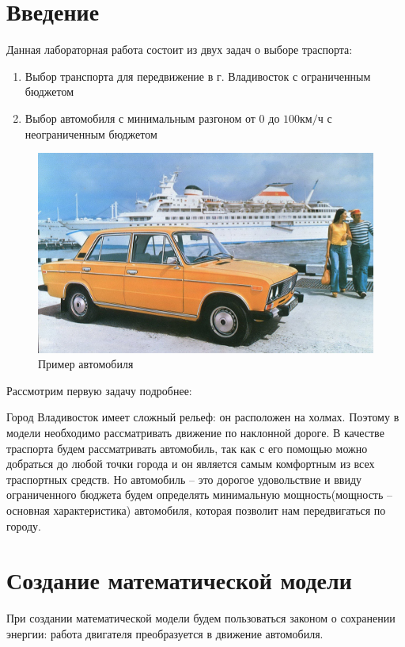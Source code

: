 \documentclass[a4paper, 14pt]{extarticle}
\begin{document}
	\pagebreak	

	\section{Введение}
		Данная лабораторная работа состоит из двух задач о выборе траспорта:
		\begin{enumerate}
			\item Выбор транспорта для передвижение в г. Владивосток с ограниченным бюджетом
			\item Выбор автомобиля с минимальным разгоном от 0 до \(100 \text{км}/\text{ч} \) с неограниченным
			бюджетом
		\end{enumerate}
	
		\begin{figure}[H]
			\centering
			\includegraphics[width = \linewidth]{fig1.jpg}
			\caption[.] {Пример автомобиля}
		\end{figure}
		Рассмотрим первую задачу подробнее:
		
			Город Владивосток имеет сложный рельеф: он расположен на холмах. Поэтому в модели необходимо рассматривать движение по наклонной дороге. В качестве траспорта будем рассматривать автомобиль, так как с его помощью можно  добраться до любой точки города и он является самым комфортным из всех траспортных средств. Но автомобиль -- это дорогое удовольствие и ввиду ограниченного бюджета будем определять  минимальную мощность(мощность -- основная характеристика) автомобиля, которая позволит нам передвигаться по городу.

	\section{Создание математической модели}
		При создании математической модели будем пользоваться законом о сохранении энергии: работа двигателя
		преобразуется в движение автомобиля.
\end{document}

